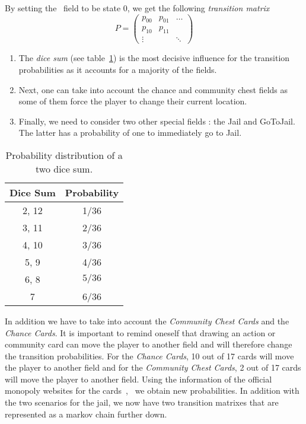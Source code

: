By setting the \go~field to be state 0, we get the following \emph{transition matrix}
\[
  P = \begin{pmatrix}
    p_{00} & p_{01} & \dots \\
    p_{10} & p_{11} &  \\
    \vdots      &  & \ddots
  \end{pmatrix}
\]

\begin{enumerate}
  \item The \emph{dice sum} (see table~\ref{tab:dice_sum_prob}) is the 
  most decisive influence for the transition probabilities
  as it accounts for a majority of the fields.
  \item Next, one can take into account the chance and community chest
  fields as some of them force the player to change their current location.
  \item Finally, we need to consider two other special fields :
  the Jail and GoToJail. The latter has a probability
  of one to immediately go to Jail.
\end{enumerate}

\begin{table}
  \begin{center}
    \begin{tabular}{|c|c|}
      \hline
        \textbf{Dice Sum} & \textbf{Probability} \\
        \hline \hline
        2, 12 & 1/36 \\
        \hline
        3, 11 & 2/36 \\
        \hline
        4, 10 & 3/36 \\
        \hline
        5, 9 & 4/36 \\
        \hline
        6, 8 & $5/36$ \\
        \hline
        7 & 6/36 \\
      \hline
    \end{tabular}
  \end{center}
  \caption{Probability distribution of a two dice sum.}
  \label{tab:dice_sum_prob}
\end{table}

In addition we have to take into account the \emph{Community Chest Cards} and 
the \emph{Chance Cards}. It is important to remind oneself that drawing an action 
or community card can move the player to another field and will therefore change the
transition probabilities. For the \emph{Chance Cards}, 10 out of 17 cards will move the player to another 
field and for the \emph{Community Chest Cards}, 2 out of 17 cards will move the player to another field. 
Using the information of the official monopoly websites for the 
cards~\cite{monopolyChestCards},~\cite{monopolyChanceCards} we obtain new probabilities. In addition with 
the two scenarios for the jail, we now have two transition matrixes that are represented as a markov chain
further down.

